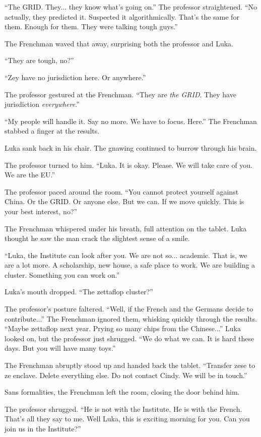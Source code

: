 \documentclass[ebook,11pt,oneside,openany]{memoir}
\begin{document}
``The GRID. They... they know what's going on.'' The professor straightened. ``No actually, they predicted it. Suspected it algorithmically. That's the same for them. Enough for them. They were talking tough guys.''

The Frenchman waved that away, surprising both the professor and Luka.

``They are tough, no?''

``Zey have no jurisdiction here. Or anywhere.''

The professor gestured at the Frenchman. ``They are \textit{the GRID}. They have jurisdiction \textit{everywhere}.''

``My people will handle it. Say no more. We have to focus. Here.'' The Frenchman stabbed a finger at the results.

Luka sank back in his chair. The gnawing continued to burrow through his brain.

The professor turned to him. ``Luka. It is okay. Please. We will take care of you. We are the EU.''

The professor paced around the room. ``You cannot protect yourself against China. Or the GRID. Or anyone else. But we can. If we move quickly. This is your best interest, no?''

The Frenchman whispered under his breath, full attention on the tablet. Luka thought he saw the man crack the slightest sense of a smile.

``Luka, the Institute can look after you. We are not so... academic. That is, we are a lot more. A scholarship, new house, a safe place to work. We are building a cluster. Something you can work on.''

Luka's mouth dropped. ``The zettaflop cluster?''

The professor's posture faltered. ``Well, if the French and the Germans decide to contribute...'' The Frenchman ignored them, whisking quickly through the results. ``Maybe zettaflop next year. Prying so many chips from the Chinese...'' Luka looked on, but the professor just shrugged. ``We do what we can. It is hard these days. But you will have many toys.''

The Frenchman abruptly stood up and handed back the tablet. ``Transfer zese to ze enclave. Delete everything else. Do not contact Cindy. We will be in touch.''

Sans formalities, the Frenchman left the room, closing the door behind him.

The professor shrugged. ``He is not with the Institute. He is with the French. That's all they say to me. Well Luka, this is exciting morning for you. Can you join us in the Institute?''
\end{document}
